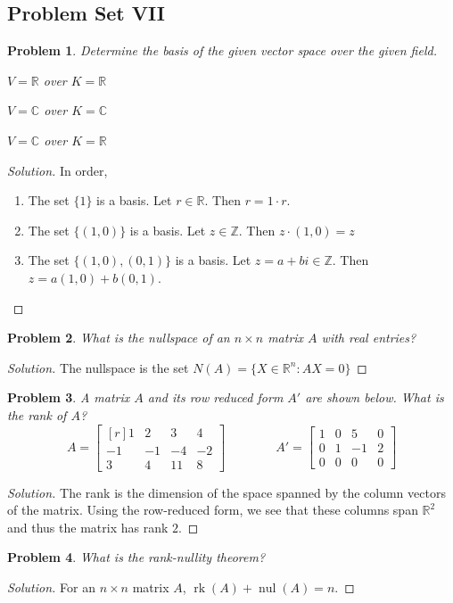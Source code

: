 \documentclass[oneside]{book}
\theoremstyle{mystyle}
\newtheorem{problem}{Problem}[section]
\DeclareMathOperator{\rk}{rk}
\DeclareMathOperator{\nul}{nul}
\begin{document}
\subsection{Problem Set VII}
\begin{problem}
Determine the basis of the given vector space over the given field.
\begin{enumerate}
\begin{multicols}{3}
    \item $V=\mathbb{R}$ over $K=\mathbb{R}$
    \item $V=\mathbb{C}$ over $K=\mathbb{C}$
    \item $V=\mathbb{C}$ over $K=\mathbb{R}$
\end{multicols}
\end{enumerate}
\end{problem}
\begin{proof}[Solution]
In order,
\begin{enumerate}
    \item The set $\{1\}$ is a basis. Let $r \in \mathbb{R}$. Then $r=1\cdot r$.
    \item The set $\{(1,0)\}$ is a basis. Let $z\in \mathbb{Z}$. Then $z\cdot(1,0) = z$
    \item The set $\{(1,0),(0,1)\}$ is a basis. Let $z=a+bi\in \mathbb{Z}$. Then $z = a(1,0)+b(0,1)$.
\end{enumerate}
\end{proof}
\begin{problem}
What is the nullspace of an $n\times n$ matrix $A$ with real entries?
\end{problem}
\begin{proof}[Solution]
The nullspace is the set $N(A) = \{X\in \mathbb{R}^n: AX = 0\}$
\end{proof}
\begin{problem}
A matrix $A$ and its row reduced form $A'$ are shown below. What is the rank of $A$?
\begin{equation*}
    A=\begin{bmatrix*}[r] 1 & 2 & 3 & 4 \\ -1 & -1 & -4 & -2 \\ 3 & 4 & 11 & 8 \end{bmatrix*} \quad\quad\quad\quad A' = \begin{bmatrix} 1 & 0 & 5 & 0 \\ 0 & 1 & -1 & 2 \\ 0 & 0 & 0 & 0 \end{bmatrix}
\end{equation*}
\end{problem}
\begin{proof}[Solution]
The rank is the dimension of the space spanned by the column vectors of the matrix. Using the row-reduced form, we see that these columns span $\mathbb{R}^2$ and thus the matrix has rank $2$.
\end{proof}
\begin{problem}
What is the rank-nullity theorem?
\end{problem}
\begin{proof}[Solution]
For an $n\times n$ matrix $A$, $\rk(A)+\nul(A) = n$.
\end{proof}
\end{document}

